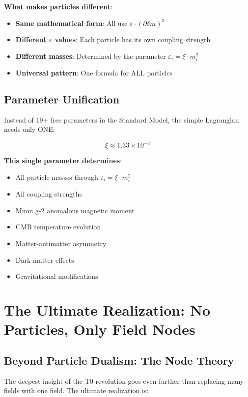 \documentclass[12pt,a4paper]{article}
\newcommand{\deltam}{\delta m}
\newcommand{\xipar}{\xi}
\theoremstyle{definition}
\theoremstyle{remark}
\begin{document}
	\textbf{What makes particles different}:
	\begin{itemize}
		\item \textbf{Same mathematical form}: All use $\varepsilon \cdot (\partial \deltam)^2$
		\item \textbf{Different $\varepsilon$ values}: Each particle has its own coupling strength
		\item \textbf{Different masses}: Determined by the parameter $\varepsilon_i = \xipar \cdot m_i^2$
		\item \textbf{Universal pattern}: One formula for ALL particles
	\end{itemize}
	
	\subsection{Parameter Unification}
	
	Instead of 19+ free parameters in the Standard Model, the simple Lagrangian needs only ONE:
	
	\begin{equation}
		\xipar \approx 1.33 \times 10^{-4}
		\label{eq:universal_parameter}
	\end{equation}
	
	\textbf{This single parameter determines}:
	\begin{itemize}
		\item All particle masses through $\varepsilon_i = \xipar \cdot m_i^2$
		\item All coupling strengths
		\item Muon g-2 anomalous magnetic moment
		\item CMB temperature evolution
		\item Matter-antimatter asymmetry
		\item Dark matter effects
		\item Gravitational modifications
	\end{itemize}
	
	\section{The Ultimate Realization: No Particles, Only Field Nodes}
	
	\subsection{Beyond Particle Dualism: The Node Theory}
	
	The deepest insight of the T0 revolution goes even further than replacing many fields with one field. The ultimate realization is:
	
\end{document}
